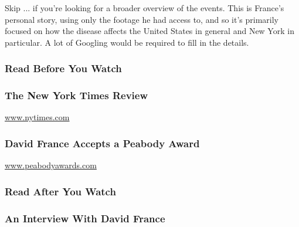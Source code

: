 Skip ... if you're looking for a broader overview of the events. This is
France's personal story, using only the footage he had access to, and so
it's primarily focused on how the disease affects the United States in
general and New York in particular. A lot of Googling would be required
to fill in the details.

\hypertarget{read-before-you-watch}{%
\subsubsection{Read Before You Watch}\label{read-before-you-watch}}

\href{http://www.nytimes.com/2012/09/21/movies/how-to-survive-a-plague-aids-documentary-by-david-france.html}{}

\hypertarget{the-new-york-times-review}{%
\subsubsection{The New York Times
Review}\label{the-new-york-times-review}}

\href{http://www.nytimes.com}{www.nytimes.com}

\href{http://www.peabodyawards.com/award-profile/independent-lens-how-to-survive-a-plague-pbs}{}

\hypertarget{david-france-accepts-a-peabody-award}{%
\subsubsection{David France Accepts a Peabody
Award}\label{david-france-accepts-a-peabody-award}}

\href{http://www.peabodyawards.com}{www.peabodyawards.com}

\hypertarget{read-after-you-watch}{%
\subsubsection{Read After You Watch}\label{read-after-you-watch}}

\href{http://www.nytimes.com/2012/12/13/fashion/how-to-survive-a-plague-provides-a-silver-lining-on-aids.html}{}

\hypertarget{an-interview-with-david-france}{%
\subsubsection{An Interview With David
France}\label{an-interview-with-david-france}}

